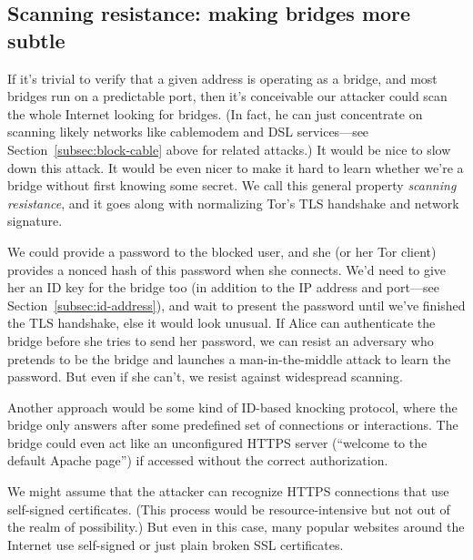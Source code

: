 \documentclass{llncs}
\begin{document}
\subsection{Scanning resistance: making bridges more subtle}

If it's trivial to verify that a given address is operating as a bridge,
and most bridges run on a predictable port, then it's conceivable our
attacker could scan the whole Internet looking for bridges. (In fact,
he can just concentrate on scanning likely networks like cablemodem
and DSL services---see Section~\ref{subsec:block-cable} above for
related attacks.) It would be nice to slow down this attack. It would
be even nicer to make it hard to learn whether we're a bridge without
first knowing some secret. We call this general property \emph{scanning
resistance}, and it goes along with normalizing Tor's TLS handshake and
network signature.

We could provide a password to the blocked user, and she (or her Tor
client) provides a nonced hash of this password when she connects. We'd
need to give her an ID key for the bridge too (in addition to the IP
address and port---see Section~\ref{subsec:id-address}), and wait to
present the password until we've finished the TLS handshake, else it
would look unusual. If Alice can authenticate the bridge before she
tries to send her password, we can resist an adversary who pretends
to be the bridge and launches a man-in-the-middle attack to learn the
password. But even if she can't, we resist against widespread scanning.

Another approach would be some kind of ID-based knocking protocol,
where the bridge only answers after some predefined set of connections
or interactions. The bridge could even act like an unconfigured HTTPS
server (``welcome to the default Apache page'') if accessed without the
correct authorization.

We might assume that the attacker can recognize HTTPS connections that
use self-signed certificates. (This process would be resource-intensive
but not out of the realm of possibility.) But even in this case, many
popular websites around the Internet use self-signed or just plain broken
SSL certificates.

\end{document}
